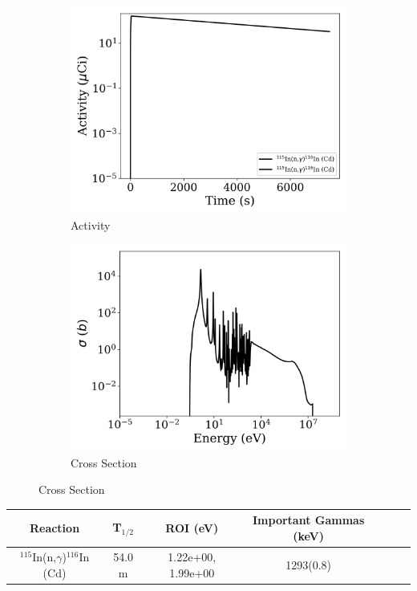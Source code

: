 \begin{figure}[h]
\centering
\begin{subfigure}{.5\textwidth}
  \centering
     \includegraphics[width=.8\textwidth]{plot/In-115(n,gamma)In-116_Cd_wisconsin1} 

  \caption{Activity}
\end{subfigure}%
\begin{subfigure}{.5\textwidth}
  \centering
     \includegraphics[width=.8\textwidth]{plot/In-115(n,gamma)In-116_Cd} 

  \caption{Cross Section}
\end{subfigure}
\end{figure}

\begin{table}[h]
\centering
\begin{tabular}{ |c|c|c|c|c|c|c| }
 \hline
 Reaction & T$_{1/2}$ & ROI (eV) & Important Gammas (keV) \\
 \hline 
 $^{115}$In(n,$\gamma$)$^{116}$In (Cd) & 54.0 m & 1.22e+00, 1.99e+00 & 1293(0.8) \\ 
\hline
\end{tabular}
\end{table}
